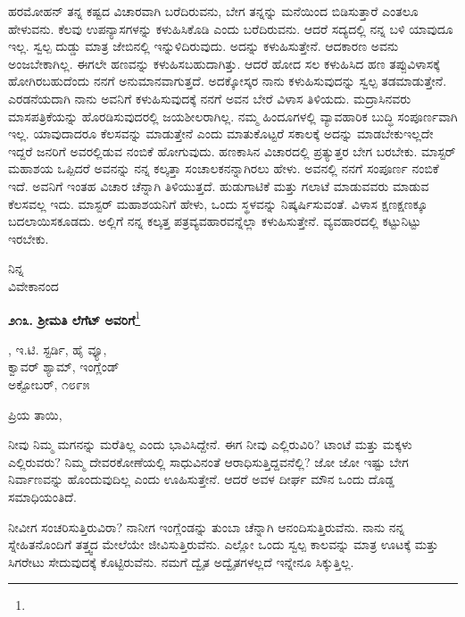 ಹರಮೋಹನ್ ತನ್ನ ಕಷ್ಟದ ವಿಚಾರವಾಗಿ ಬರೆದಿರುವನು, ಬೇಗ ತನ್ನನ್ನು ಮನೆಯಿಂದ ಬಿಡಿಸುತ್ತಾರೆ ಎಂತಲೂ ಹೇಳುವನು. ಕೆಲವು ಉಪನ್ಯಾಸಗಳನ್ನು ಕಳುಹಿಸಿಕೊಡಿ ಎಂದು ಬರೆದಿರುವನು. ಆದರೆ ಸದ್ಯದಲ್ಲಿ ನನ್ನ ಬಳಿ ಯಾವುದೂ ಇಲ್ಲ. ಸ್ವಲ್ಪ ದುಡ್ಡು ಮಾತ್ರ ಜೇಬಿನಲ್ಲಿ ಇನ್ನುಳಿದಿರುವುದು. ಅದನ್ನು ಕಳುಹಿಸುತ್ತೇನೆ. ಆದಕಾರಣ ಅವನು ಅಂಜಬೇಕಾಗಿಲ್ಲ. ಈಗಲೇ ಹಣವನ್ನು ಕಳುಹಿಸಬಹುದಾಗಿತ್ತು. ಆದರೆ ಹೋದ ಸಲ ಕಳುಹಿಸಿದ ಹಣ ತಪ್ಪುವಿಳಾಸಕ್ಕೆ ಹೋಗಿರಬಹುದೆಂದು ನನಗೆ ಅನುಮಾನವಾಗುತ್ತದೆ. ಅದಕ್ಕೋಸ್ಕರ ನಾನು ಕಳುಹಿಸುವುದನ್ನು ಸ್ವಲ್ಪ ತಡಮಾಡುತ್ತೇನೆ. ಎರಡನೆಯದಾಗಿ ನಾನು ಅವನಿಗೆ ಕಳುಹಿಸುವುದಕ್ಕೆ ನನಗೆ ಅವನ ಬೇರೆ ವಿಳಾಸ ತಿಳಿಯದು. ಮದ್ರಾಸಿನವರು ಮಾಸಪತ್ರಿಕೆಯನ್ನು ಹೊರಡಿಸುವುದರಲ್ಲಿ ಜಯಶೀಲರಾಗಿಲ್ಲ. ನಮ್ಮ ಹಿಂದೂಗಳಲ್ಲಿ ವ್ಯಾವಹಾರಿಕ ಬುದ್ಧಿ ಸಂಪೂರ್ಣವಾಗಿ ಇಲ್ಲ. ಯಾವುದಾದರೂ ಕೆಲಸವನ್ನು ಮಾಡುತ್ತೇನೆ ಎಂದು ಮಾತುಕೊಟ್ಟರೆ ಸಕಾಲಕ್ಕೆ ಅದನ್ನು ಮಾಡಬೇಕು\enginline{-}ಇಲ್ಲದೇ ಇದ್ದರೆ ಜನರಿಗೆ ಅವರಲ್ಲಿಡುವ ನಂಬಿಕೆ ಹೋಗುವುದು. ಹಣಕಾಸಿನ ವಿಚಾರದಲ್ಲಿ ಪ್ರತ್ಯುತ್ತರ ಬೇಗ ಬರಬೇಕು. ಮಾಸ್ಟರ್ ಮಹಾಶಯ ಒಪ್ಪಿದರೆ ಅವನನ್ನು ನನ್ನ ಕಲ್ಕತ್ತಾ ಸಂಚಾಲಕನನ್ನಾಗಿರಲು ಹೇಳು. ಅವನಲ್ಲಿ ನನಗೆ ಸಂಪೂರ್ಣ ನಂಬಿಕೆ ಇದೆ. ಅವನಿಗೆ ಇಂತಹ ವಿಚಾರ ಚೆನ್ನಾಗಿ ತಿಳಿಯುತ್ತದೆ. ಹುಡುಗಾಟಿಕೆ ಮತ್ತು ಗಲಾಟೆ ಮಾಡುವವರು ಮಾಡುವ ಕೆಲಸವಲ್ಲ ಇದು. ಮಾಸ್ಟರ್ ಮಹಾಶಯನಿಗೆ ಹೇಳು, ಒಂದು ಸ್ಥಳವನ್ನು ನಿಷ್ಕರ್ಷಿಸುವಂತೆ. ವಿಳಾಸ ಕ್ಷಣಕ್ಷಣಕ್ಕೂ ಬದಲಾಯಿಸಕೂಡದು. ಅಲ್ಲಿಗೆ ನನ್ನ ಕಲ್ಕತ್ತ ಪತ್ರವ್ಯವಹಾರವನ್ನೆಲ್ಲಾ ಕಳುಹಿಸುತ್ತೇನೆ. ವ್ಯವಹಾರದಲ್ಲಿ ಕಟ್ಟುನಿಟ್ಟು ಇರಬೇಕು.

\vspace{-0.4cm}

{\flushright
ನಿನ್ನ\\ವಿವೇಕಾನಂದ\par}


\begin{center}
\textbf{೨೧೩. ಶ‍್ರೀಮತಿ ಲೆಗೆಟ್ ಅವರಿಗೆ}\footnote{}
\end{center}

\begin{flushright}
, ಇ.ಟಿ. ಸ್ಟರ್ಡಿ, ಹೈ ವ್ಯೂ,\\ಕ್ವಾವರ್ ಶ್ಯಾಮ್, ಇಂಗ್ಲೆಂಡ್\\ಅಕ್ಟೋಬರ್, ೧೮೯೫
\end{flushright}


\noindent
ಪ್ರಿಯ ತಾಯಿ,

ನೀವು ನಿಮ್ಮ ಮಗನನ್ನು ಮರೆತಿಲ್ಲ ಎಂದು ಭಾವಿಸಿದ್ದೇನೆ. ಈಗ ನೀವು ಎಲ್ಲಿರುವಿರಿ? ಟಾಂಟೆ ಮತ್ತು ಮಕ್ಕಳು ಎಲ್ಲಿರುವರು? ನಿಮ್ಮ ದೇವರಕೋಣೆಯಲ್ಲಿ ಸಾಧುವಿನಂತೆ ಆರಾಧಿಸುತ್ತಿದ್ದವನೆಲ್ಲಿ? ಜೋ ಜೋ ಇಷ್ಟು ಬೇಗ ನಿರ್ವಾಣವನ್ನು ಹೊಂದುವುದಿಲ್ಲ ಎಂದು ಊಹಿಸುತ್ತೇನೆ. ಆದರೆ ಅವಳ ದೀರ್ಘ ಮೌನ ಒಂದು ದೊಡ್ಡ ಸಮಾಧಿಯಂತಿದೆ.

ನೀವೀಗ ಸಂಚರಿಸುತ್ತಿರುವಿರಾ? ನಾನೀಗ ಇಂಗ್ಲೆಂಡನ್ನು ತುಂಬಾ ಚೆನ್ನಾಗಿ ಆನಂದಿಸು\break ತ್ತಿರುವೆನು. ನಾನು ನನ್ನ ಸ್ನೇಹಿತನೊಂದಿಗೆ ತತ್ತ್ವದ ಮೇಲೆಯೇ ಜೀವಿಸುತ್ತಿರುವೆನು. ಎಲ್ಲೋ ಒಂದು ಸ್ವಲ್ಪ ಕಾಲವನ್ನು ಮಾತ್ರ ಊಟಕ್ಕೆ ಮತ್ತು ಸಿಗರೇಟು ಸೇದುವುದಕ್ಕೆ ಕೊಟ್ಟಿರುವೆನು. ನಮಗೆ ದ್ವೈತ ಅದ್ವೈತಗಳಲ್ಲದೆ ಇನ್ನೇನೂ ಸಿಕ್ಕುತ್ತಿಲ್ಲ.

